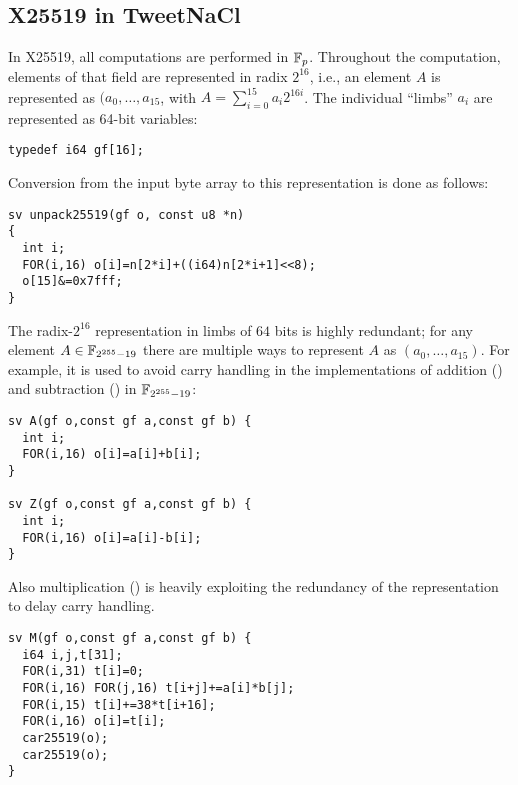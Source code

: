 
\subsection{X25519 in TweetNaCl}
\label{preliminaries:B}


In X25519, all computations are performed in $\mathbb{F}_{p}$.
Throughout the computation, elements of that field
are represented in radix $2^{16}$,
i.e., an element $A$ is represented as $(a_0,\dots,a_{15}$,
with $A = \sum_{i=0}^{15}a_i2^{16i}$.
The individual ``limbs'' $a_i$ are represented as
64-bit  variables:

\begin{lstlisting}[language=Ctweetnacl]
typedef i64 gf[16];
\end{lstlisting}

Conversion from the input byte array to this representation is done
as follows:
\begin{lstlisting}[language=Ctweetnacl]
sv unpack25519(gf o, const u8 *n)
{
  int i;
  FOR(i,16) o[i]=n[2*i]+((i64)n[2*i+1]<<8);
  o[15]&=0x7fff;
}
\end{lstlisting}

The radix-$2^{16}$ representation in limbs of $64$ bits is
highly redundant; for any element $A \in \mathbb{F}_{2^{255}-19}$ there are
multiple ways to represent $A$ as $(a_0,\dots,a_{15})$.
For example, it is used to avoid carry handling in
the implementations of addition ()
and subtraction () in $\mathbb{F}_{2^{255}-19}$:

\begin{lstlisting}[language=Ctweetnacl]
sv A(gf o,const gf a,const gf b) {
  int i;
  FOR(i,16) o[i]=a[i]+b[i];
}

sv Z(gf o,const gf a,const gf b) {
  int i;
  FOR(i,16) o[i]=a[i]-b[i];
}
\end{lstlisting}

Also multiplication () is heavily exploiting the redundancy
of the representation to delay carry handling.

\begin{lstlisting}[language=Ctweetnacl]
sv M(gf o,const gf a,const gf b) {
  i64 i,j,t[31];
  FOR(i,31) t[i]=0;
  FOR(i,16) FOR(j,16) t[i+j]+=a[i]*b[j];
  FOR(i,15) t[i]+=38*t[i+16];
  FOR(i,16) o[i]=t[i];
  car25519(o);
  car25519(o);
}
\end{lstlisting}

